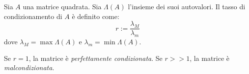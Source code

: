 \begin{definition}
  \label{dfn:matrix.conditioning.rate}
  Sia $A$ una matrice quadrata. Sia $\Lambda(A)$ l'insieme dei suoi autovalori. Il tasso di condizionamento di $A$ è definito come:
  \begin{equation}
    \label{eqn:matrix.conditioning.rate}
    r:=\frac{\lambda_{M}}{\lambda_{m}}
  \end{equation}
  dove $\lambda_{M}=\max\Lambda(A)$ e $\lambda_{m}=\min\Lambda(A)$.
\end{definition}

Se $r=1$, la matrice è \textit{perfettamente condizionata}. Se $r>>1$, la matrice è \textit{malcondizionata}.
